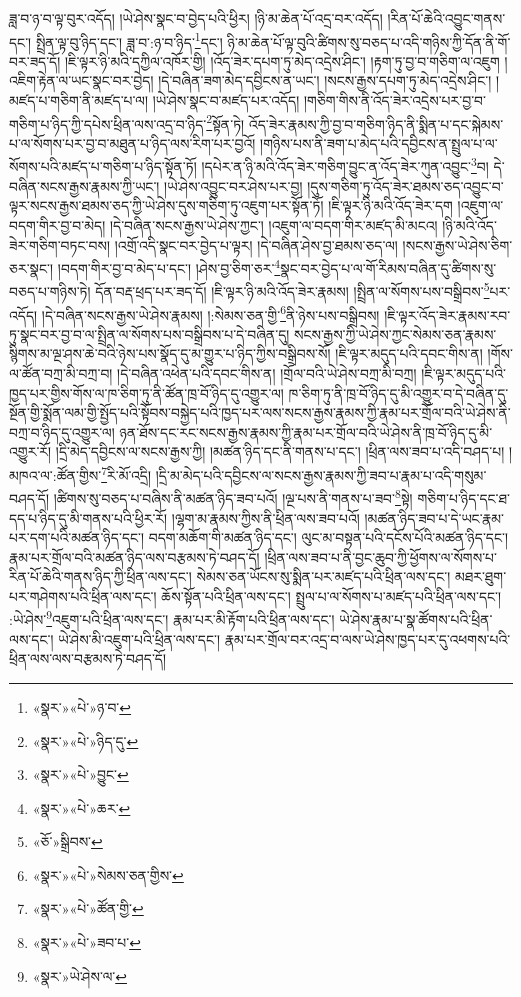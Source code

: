 ཟླ་བ་ཉ་བ་ལྟ་བུར་འདོད། །ཡེ་ཤེས་སྣང་བ་བྱེད་པའི་ཕྱིར། །ཉི་མ་ཆེན་པོ་འདྲ་བར་འདོད། །རིན་པོ་ཆེའི་འབྱུང་གནས་དང་། སྤྲིན་ལྟ་བུ་ཉིད་དང་། ཟླ་བ་:ཉ་བ་ཉིད་\footnote{«སྣར་»«པེ་»ཉ་བ་}དང་། ཉི་མ་ཆེན་པོ་ལྟ་བུའི་ཚིགས་སུ་བཅད་པ་འདི་གཉིས་ཀྱི་དོན་ནི་གོ་བར་ཟད་དོ། །ཇི་ལྟར་ཉི་མའི་དཀྱིལ་འཁོར་གྱི། །འོད་ཟེར་དཔག་ཏུ་མེད་འདྲེས་ཤིང་། །རྟག་ཏུ་བྱ་བ་གཅིག་ལ་འཇུག །འཇིག་རྟེན་ལ་ཡང་སྣང་བར་བྱེད། །དེ་བཞིན་ཟག་མེད་དབྱིངས་ན་ཡང་། །སངས་རྒྱས་དཔག་ཏུ་མེད་འདྲེས་ཤིང་། །མཛད་པ་གཅིག་ནི་མཛད་པ་ལ། །ཡེ་ཤེས་སྣང་བ་མཛད་པར་འདོད། །གཅིག་གིས་ནི་འོད་ཟེར་འདྲེས་པར་བྱ་བ་གཅིག་པ་ཉིད་ཀྱི་དཔེས་ཕྲིན་ལས་འདྲ་བ་ཉིད་\footnote{«སྣར་»«པེ་»ཉིད་དུ་}སྟོན་ཏེ། འོད་ཟེར་རྣམས་ཀྱི་བྱ་བ་གཅིག་ཉིད་ནི་སྨིན་པ་དང་སྐེམས་པ་ལ་སོགས་པར་བྱ་བ་མཐུན་པ་ཉིད་ལས་རིག་པར་བྱའོ། །གཉིས་པས་ནི་ཟག་པ་མེད་པའི་དབྱིངས་ན་སྤྲུལ་པ་ལ་སོགས་པའི་མཛད་པ་གཅིག་པ་ཉིད་སྟོན་ཏོ། །དཔེར་ན་ཉི་མའི་འོད་ཟེར་གཅིག་བྱུང་ན་འོད་ཟེར་ཀུན་འབྱུང་\footnote{«སྣར་»«པེ་»བྱུང་}བ། དེ་བཞིན་སངས་རྒྱས་རྣམས་ཀྱི་ཡང་། །ཡེ་ཤེས་འབྱུང་བར་ཤེས་པར་བྱ། །དུས་གཅིག་ཏུ་འོད་ཟེར་ཐམས་ཅད་འབྱུང་བ་ལྟར་སངས་རྒྱས་ཐམས་ཅད་ཀྱི་ཡེ་ཤེས་དུས་གཅིག་ཏུ་འཇུག་པར་སྟོན་ཏོ། །ཇི་ལྟར་ཉི་མའི་འོད་ཟེར་དག །འཇུག་ལ་བདག་གིར་བྱ་བ་མེད། །དེ་བཞིན་སངས་རྒྱས་ཡེ་ཤེས་ཀྱང་། །འཇུག་ལ་བདག་གིར་མཛད་མི་མངའ། །ཉི་མའི་འོད་ཟེར་གཅིག་བཏང་བས། །འགྲོ་འདི་སྣང་བར་བྱེད་པ་ལྟར། །དེ་བཞིན་ཤེས་བྱ་ཐམས་ཅད་ལ། །སངས་རྒྱས་ཡེ་ཤེས་ཅིག་ཅར་སྣང་། །བདག་གིར་བྱ་བ་མེད་པ་དང་། །ཤེས་བྱ་ཅིག་ཅར་\footnote{«སྣར་»«པེ་»ཆར་}སྣང་བར་བྱེད་པ་ལ་གོ་རིམས་བཞིན་དུ་ཚིགས་སུ་བཅད་པ་གཉིས་ཏེ། དོན་བརྡ་ཕྲད་པར་ཟད་དོ། །ཇི་ལྟར་ཉི་མའི་འོད་ཟེར་རྣམས། །སྤྲིན་ལ་སོགས་པས་བསྒྲིབས་\footnote{«ཅོ་»སྒྲིབས་}པར་འདོད། །དེ་བཞིན་སངས་རྒྱས་ཡེ་ཤེས་རྣམས། །:སེམས་ཅན་གྱི་\footnote{«སྣར་»«པེ་»སེམས་ཅན་གྱིས་}ནི་ཉེས་པས་བསྒྲིབས། །ཇི་ལྟར་འོད་ཟེར་རྣམས་རབ་ཏུ་སྣང་བར་བྱ་བ་ལ་སྤྲིན་ལ་སོགས་པས་བསྒྲིབས་པ་དེ་བཞིན་དུ། སངས་རྒྱས་ཀྱི་ཡེ་ཤེས་ཀྱང་སེམས་ཅན་རྣམས་སྙིགས་མ་ལྔ་ཤས་ཆེ་བའི་ཉེས་པས་སྣོད་དུ་མ་གྱུར་པ་ཉིད་ཀྱིས་བསྒྲིབས་སོ། །ཇི་ལྟར་མདུད་པའི་དབང་གིས་ན། །གོས་ལ་ཚོན་བཀྲ་མི་བཀྲ་བ། །དེ་བཞིན་འཕེན་པའི་དབང་གིས་ན། །གྲོལ་བའི་ཡེ་ཤེས་བཀྲ་མི་བཀྲ། །ཇི་ལྟར་མདུད་པའི་ཁྱད་པར་གྱིས་གོས་ལ་ཁ་ཅིག་ཏུ་ནི་ཚོན་ཁྲ་བོ་ཉིད་དུ་འགྱུར་ལ། ཁ་ཅིག་ཏུ་ནི་ཁྲ་བོ་ཉིད་དུ་མི་འགྱུར་བ་དེ་བཞིན་དུ་སྔོན་གྱི་སྨོན་ལམ་གྱི་སྤྱོད་པའི་སྟོབས་བསྐྱེད་པའི་ཁྱད་པར་ལས་སངས་རྒྱས་རྣམས་ཀྱི་རྣམ་པར་གྲོལ་བའི་ཡེ་ཤེས་ནི་བཀྲ་བ་ཉིད་དུ་འགྱུར་ལ། ཉན་ཐོས་དང་རང་སངས་རྒྱས་རྣམས་ཀྱི་རྣམ་པར་གྲོལ་བའི་ཡེ་ཤེས་ནི་ཁྲ་བོ་ཉིད་དུ་མི་འགྱུར་རོ། །དྲི་མེད་དབྱིངས་ལ་སངས་རྒྱས་ཀྱི། །མཚན་ཉིད་དང་ནི་གནས་པ་དང་། །ཕྲིན་ལས་ཟབ་པ་འདི་བཤད་པ། །མཁའ་ལ་:ཚོན་གྱིས་\footnote{«སྣར་»«པེ་»ཚོན་གྱི་}རི་མོ་འདྲི། །དྲི་མ་མེད་པའི་དབྱིངས་ལ་སངས་རྒྱས་རྣམས་ཀྱི་ཟབ་པ་རྣམ་པ་འདི་གསུམ་བཤད་དོ། །ཚིགས་སུ་བཅད་པ་བཞིས་ནི་མཚན་ཉིད་ཟབ་པའོ། །ལྔ་པས་ནི་གནས་པ་ཟབ་\footnote{«སྣར་»«པེ་»ཟབ་པ་}སྟེ། གཅིག་པ་ཉིད་དང་ཐ་དད་པ་ཉིད་དུ་མི་གནས་པའི་ཕྱིར་རོ། །ལྷག་མ་རྣམས་ཀྱིས་ནི་ཕྲིན་ལས་ཟབ་པའོ། །མཚན་ཉིད་ཟབ་པ་དེ་ཡང་རྣམ་པར་དག་པའི་མཚན་ཉིད་དང་། བདག་མཆོག་གི་མཚན་ཉིད་དང་། ལུང་མ་བསྟན་པའི་དངོས་པོའི་མཚན་ཉིད་དང་། རྣམ་པར་གྲོལ་བའི་མཚན་ཉིད་ལས་བརྩམས་ཏེ་བཤད་དོ། །ཕྲིན་ལས་ཟབ་པ་ནི་བྱང་ཆུབ་ཀྱི་ཕྱོགས་ལ་སོགས་པ་རིན་པོ་ཆེའི་གནས་ཉིད་ཀྱི་ཕྲིན་ལས་དང་། སེམས་ཅན་ཡོངས་སུ་སྨིན་པར་མཛད་པའི་ཕྲིན་ལས་དང་། མཐར་ཐུག་པར་གཤེགས་པའི་ཕྲིན་ལས་དང་། ཆོས་སྟོན་པའི་ཕྲིན་ལས་དང་། སྤྲུལ་པ་ལ་སོགས་པ་མཛད་པའི་ཕྲིན་ལས་དང་། :ཡེ་ཤེས་\footnote{«སྣར་»ཡེ་ཤེས་ལ་}འཇུག་པའི་ཕྲིན་ལས་དང་། རྣམ་པར་མི་རྟོག་པའི་ཕྲིན་ལས་དང་། ཡེ་ཤེས་རྣམ་པ་སྣ་ཚོགས་པའི་ཕྲིན་ལས་དང་། ཡེ་ཤེས་མི་འཇུག་པའི་ཕྲིན་ལས་དང་། རྣམ་པར་གྲོལ་བར་འདྲ་བ་ལས་ཡེ་ཤེས་ཁྱད་པར་དུ་འཕགས་པའི་ཕྲིན་ལས་ལས་བརྩམས་ཏེ་བཤད་དོ། 